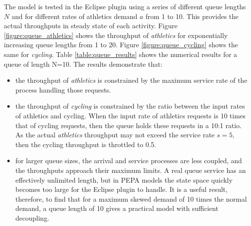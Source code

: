 \FloatBarrier
The model is tested in the Eclipse plugin using a series of different queue lengths $\mathit{N}$ and for different rates of athletics demand $\mathit{a}$ from 1 to 10.  This provides the actual throughputs in steady state of each activity.  Figure \ref{figure:queue_athletics} shows the throughput of {\itshape athletics} for exponentially increasing queue lengths from 1 to 20.  Figure \ref{figure:queue_cycling} shows the same for {\itshape cycling}.  Table \ref{table:queue_results} shows the numerical results for a queue of length N=10.
The results demonstrate that:
\begin{itemize}
	\item the throughput of {\itshape athletics} is constrained by the maximum service rate of the process handling those requests.
	\item the throughput of {\itshape cycling} is constrained by the ratio between the input rates of athletics and cycling.  When the input rate of athletics requests is 10 times that of cycling requests, then the queue holds these requests in a 10:1 ratio.  As the actual {\itshape athletics} throughput may not exceed the service rate $\mathit{s=5}$, then the cycling throughput is throttled to 0.5.
	\item for larger queue sizes, the arrival and service processes are less coupled, and the throughputs approach their maximum limits.  A real queue service has an effectively unlimited length, but in PEPA models the state space quickly becomes too large for the Eclipse plugin to handle.  It is a useful result, therefore, to find that for a maximum skewed demand of 10 times the normal demand, a queue length of 10 gives a practical model with sufficient decoupling.
\end{itemize}

